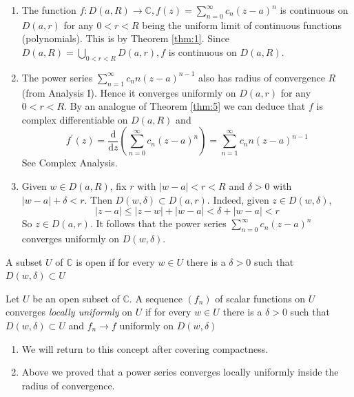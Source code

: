 \documentclass[a4paper,11pt]{article}
\begin{document}
\begin{remark}
    \begin{enumerate}
        \item The function $f: D(a, R) \rightarrow \mathbb{C}, f(z)=\sum_{n=0}^{\infty} c_{n}(z-a)^{n}$ is continuous on $D(a, r)$ for any $0<r<R$ being the uniform limit of continuous functions (polynomials). This is by Theorem \ref{thm:1}. Since $D(a, R)=\bigcup_{0<r<R} D(a, r), f$ is continuous on $D(a, R)$.
        
        \item  The power series $\sum_{n=1}^{\infty} c_{n} n(z-a)^{n-1}$ also has radius of convergence $R$ (from Analysis I). Hence it converges uniformly on $D(a, r)$ for any $0<r<R$. By an analogue of Theorem \ref{thm:5} we can deduce that $f$ is complex differentiable on $D(a, R)$ and
        \[
        f^{\prime}(z)=\frac{\mathrm{d}}{\mathrm{d} z}\left(\sum_{n=0}^{\infty} c_{n}(z-a)^{n}\right)=\sum_{n=1}^{\infty} c_{n} n(z-a)^{n-1}
        \]
        See Complex Analysis.
    
        \item Given $w \in D(a, R)$, fix $r$ with $|w-a|<r<R$ and $\delta>0$ with $|w-a|+\delta<r$. Then $D(w, \delta) \subset D(a, r) .$ Indeed, given $z \in D(w, \delta)$,
        \[
        |z-a| \leqslant|z-w|+|w-a|<\delta+|w-a|<r
        \]
        So $z \in D(a, r)$. It follows that the power series $\sum_{n=0}^{\infty} c_{n}(z-a)^{n}$ converges uniformly on $D(w, \delta)$.
    \end{enumerate}
\end{remark}
\begin{definition}
    A subset $U$ of $\mathbb{C}$ is open if for every $w \in U$ there is a $\delta>0$ such that $D(w, \delta) \subset U$
\end{definition}

\begin{definition}
    Let $U$ be an open subset of $\mathbb{C}$. A sequence $\left(f_{n}\right)$ of scalar functions on $U$ converges \textit{locally uniformly} on $U$ if for every $w \in U$ there is a $\delta>0$ such that $D(w, \delta) \subset U$ and $f_{n} \rightarrow f$ uniformly on $D(w, \delta)$
\end{definition}

\begin{remark}
    \begin{enumerate}
        \item We will return to this concept after covering compactness.
        \item Above we proved that a power series converges locally uniformly inside the radius of convergence.
    \end{enumerate}
\end{remark}
\end{document}
